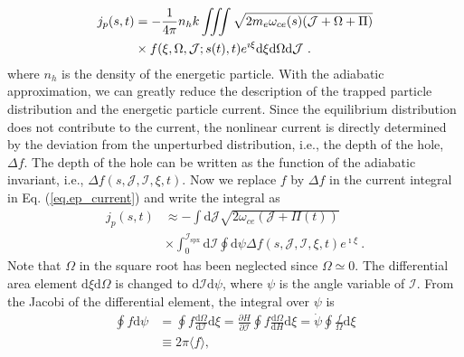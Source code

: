 \cite{zheng2024}
\begin{equation}\label{eq.ep_current}
    \begin{aligned}
j_p(s,t) & = -\frac{1}{ 4 \pi } n_h k \iiint \sqrt{2m_e\omega_{ce}(s)(\mathcal{J}+\Omega+\Pi)} 
 \\
 &\times f(\xi,\Omega,\mathcal{J};s(t),t)e^{\imath \xi} \rm d \xi \rm d \Omega \rm d \mathcal{J}~.
    \end{aligned}
\end{equation}
where $n_h$ is the density of the energetic particle.
With the adiabatic approximation, we can greatly reduce the description of the trapped particle distribution and the energetic particle current.
Since the equilibrium distribution does not contribute to the current, the nonlinear current is directly determined by 
the deviation from the unperturbed distribution, i.e., the depth of the hole,
$\Delta f$.
The depth of the hole can be written as the function of the adiabatic invariant, i.e., $\Delta f(s,\mathcal{J},\mathcal{I},\xi,t)$.
Now we replace $f$ by $\Delta f$ in the current integral in Eq. (\ref{eq.ep_current}) and write  the integral as
\begin{equation}
\begin{aligned}
    j_p(s,t) & \approx - \int\mathrm{d} \mathcal{J} \sqrt{2 \omega_{ce} (\mathcal{J} + \Pi(t))}
    \\
    &\times \int_0^{\mathcal{I}_{\mathrm{s p x}}}  \mathrm{d}\mathcal{I}  \oint \mathrm{d}\psi  \Delta f(s,\mathcal{J},\mathcal{I},\xi,t)e^{\imath \xi}  ~.
\end{aligned}
\end{equation}
Note that $\Omega$ in the square root has been  neglected since $\Omega \simeq 0$.
The differential area element $\mathrm{d}\xi\mathrm{d}\Omega$ is changed to $\mathrm{d}\mathcal{I}\mathrm{d}\psi$, where $\psi$ is the angle variable of $\mathcal{I}$.
From the Jacobi of the differential element, the integral over $\psi$ is
\begin{equation}
    \begin{aligned}
      \oint f \mathrm{d}\psi & = \oint f \frac{\mathrm{d}\Omega}{\mathrm{d}\mathcal{I}}\mathrm{d}\xi = \frac{\partial H}{\partial \mathcal{I}} \oint f \frac{\mathrm{d}\Omega}{\mathrm{d} H}\mathrm{d}\xi = \dot{\psi}\oint \frac{f}{\Omega} \mathrm{d}\xi
      \\
      &\equiv 2 \pi \langle f \rangle,
    \end{aligned}
\end{equation}
